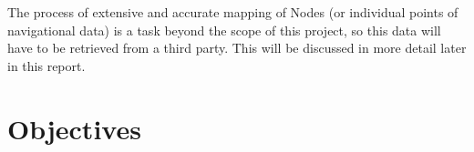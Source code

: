 The process of extensive and accurate mapping of Nodes (or individual points of navigational data) is a task beyond the scope of this project, so this data will have to be retrieved from a third party. This will be discussed in more detail later in this report.

\section{Objectives}
